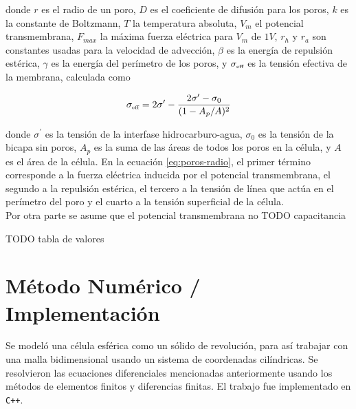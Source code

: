 \documentclass[a4paper,10pt]{article}
\begin{document}
donde $r$ es el radio de un poro, $D$ es el coeficiente de difusión para los poros, $k$ es la constante de Boltzmann, $T$ la temperatura absoluta, $V_m$ el potencial transmembrana, $F_{max}$ la máxima fuerza eléctrica para $V_m$ de $1V$, $r_h$ y $r_a$ son constantes usadas para la velocidad de advección, $\beta$ es la energía de repulsión estérica, $\gamma$ es la energía del perímetro de los poros, y $\sigma_{\textrm{\tiny eff}}$ es la tensión efectiva de la membrana, calculada como

\begin{equation}
	\sigma_{\textrm{\tiny eff}} = 2 \sigma^\prime - \frac{2 \sigma^\prime - \sigma_0}{(1 - A_p / A)^2}
\end{equation}

donde $\sigma^\prime$ es la tensión de la interfase hidrocarburo-agua, $\sigma_0$ es la tensión de la bicapa sin poros, $A_p$ es la suma de las áreas de todos los poros en la célula, y $A$ es el área de la célula. En la ecuación \ref{eq:poros-radio}, el primer término corresponde a la fuerza eléctrica inducida por el potencial transmembrana, el segundo a la repulsión estérica, el tercero a la tensión de línea que actúa en el perímetro del poro y el cuarto a la tensión superficial de la célula.\\

Por otra parte se asume que el potencial transmembrana no 
TODO capacitancia

TODO tabla de valores


\section{Método Numérico / Implementación}


Se modeló una célula esférica como un sólido de revolución, para así trabajar con una malla bidimensional usando un sistema de coordenadas cilíndricas. Se resolvieron las ecuaciones diferenciales mencionadas anteriormente usando los métodos de elementos finitos y diferencias finitas. El trabajo fue implementado en \texttt{C++}.

\end{document}
